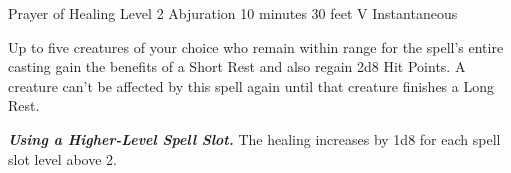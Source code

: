 \DndSpellHeader%
    {Prayer of Healing}
    {Level 2 Abjuration}
    {10 minutes}
    {30 feet}
    {V}
    {Instantaneous}

Up to five creatures of your choice who remain within range for the spell's entire casting gain the benefits of a Short Rest and also regain 2d8 Hit Points. A creature can't be affected by this spell again until that creature finishes a Long Rest.

\textbf{\textit{Using a Higher-Level Spell Slot.}} The healing increases by 1d8 for each spell slot level above 2.
